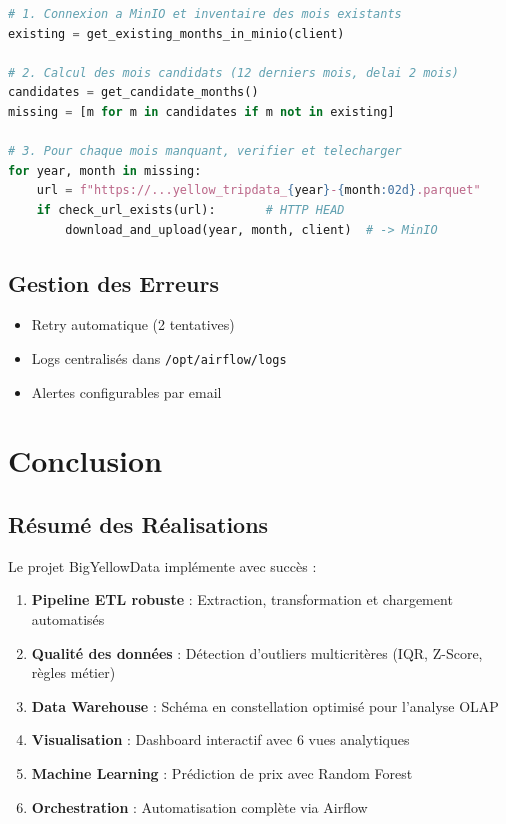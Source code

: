 \documentclass[12pt,a4paper]{report}
\begin{document}
\begin{lstlisting}[language=Python, caption=Logique principale du telechargement automatique]
# 1. Connexion a MinIO et inventaire des mois existants
existing = get_existing_months_in_minio(client)

# 2. Calcul des mois candidats (12 derniers mois, delai 2 mois)
candidates = get_candidate_months()
missing = [m for m in candidates if m not in existing]

# 3. Pour chaque mois manquant, verifier et telecharger
for year, month in missing:
    url = f"https://...yellow_tripdata_{year}-{month:02d}.parquet"
    if check_url_exists(url):       # HTTP HEAD
        download_and_upload(year, month, client)  # -> MinIO
\end{lstlisting}

\section{Gestion des Erreurs}

\begin{itemize}
    \item Retry automatique (2 tentatives)
    \item Logs centralisés dans \texttt{/opt/airflow/logs}
    \item Alertes configurables par email
\end{itemize}

\chapter{Conclusion}

\section{Résumé des Réalisations}

Le projet BigYellowData implémente avec succès :

\begin{enumerate}
    \item \textbf{Pipeline ETL robuste} : Extraction, transformation et chargement automatisés
    \item \textbf{Qualité des données} : Détection d'outliers multicritères (IQR, Z-Score, règles métier)
    \item \textbf{Data Warehouse} : Schéma en constellation optimisé pour l'analyse OLAP
    \item \textbf{Visualisation} : Dashboard interactif avec 6 vues analytiques
    \item \textbf{Machine Learning} : Prédiction de prix avec Random Forest
    \item \textbf{Orchestration} : Automatisation complète via Airflow
\end{enumerate}
\end{document}
